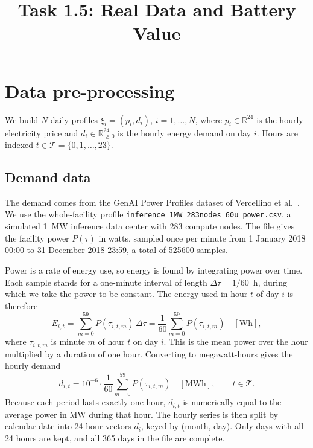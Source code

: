 \documentclass[11pt]{article}
\title{Task 1.5: Real Data and Battery Value}
\date{}
\begin{document}
\maketitle

\section{Data pre-processing}

We build $N$ daily profiles $\xi_i = (p_i, d_i)$, $i = 1, \dots, N$, where
$p_i \in \mathbb{R}^{24}$ is the hourly electricity price and
$d_i \in \mathbb{R}^{24}_{\ge 0}$ is the hourly energy demand on day $i$.
Hours are indexed $t \in \mathcal{T} = \{0, 1, \dots, 23\}$.

\subsection{Demand data}

The demand comes from the GenAI Power Profiles dataset of Vercellino et
al.~\cite{vercellino2026}. We use the whole-facility profile
\texttt{inference\_1MW\_283nodes\_60u\_power.csv}, a simulated \SI{1}{MW}
inference data center with 283 compute nodes. The file gives the facility power
$P(\tau)$ in watts, sampled once per minute from 1 January 2018 00:00 to
31 December 2018 23:59, a total of \num{525600} samples.

Power is a rate of energy use, so energy is found by integrating power over time.
Each sample stands for a one-minute interval of length $\Delta\tau = 1/60$~h,
during which we take the power to be constant. The energy used in hour $t$ of day
$i$ is therefore
\begin{equation}
  E_{i,t}
  = \sum_{m=0}^{59} P(\tau_{i,t,m}) \, \Delta\tau
  = \frac{1}{60} \sum_{m=0}^{59} P(\tau_{i,t,m}) \quad [\text{Wh}],
\end{equation}
where $\tau_{i,t,m}$ is minute $m$ of hour $t$ on day $i$. This is the mean power
over the hour multiplied by a duration of one hour. Converting to megawatt-hours
gives the hourly demand
\begin{equation}
  d_{i,t} = 10^{-6} \cdot \frac{1}{60} \sum_{m=0}^{59} P(\tau_{i,t,m})
  \quad [\text{MWh}], \qquad t \in \mathcal{T}.
\end{equation}
Because each period lasts exactly one hour, $d_{i,t}$ is numerically equal to the
average power in MW during that hour. The hourly series is then split by calendar
date into 24-hour vectors $d_i$, keyed by (month, day). Only days with all 24
hours are kept, and all 365 days in the file are complete.
\end{document}

